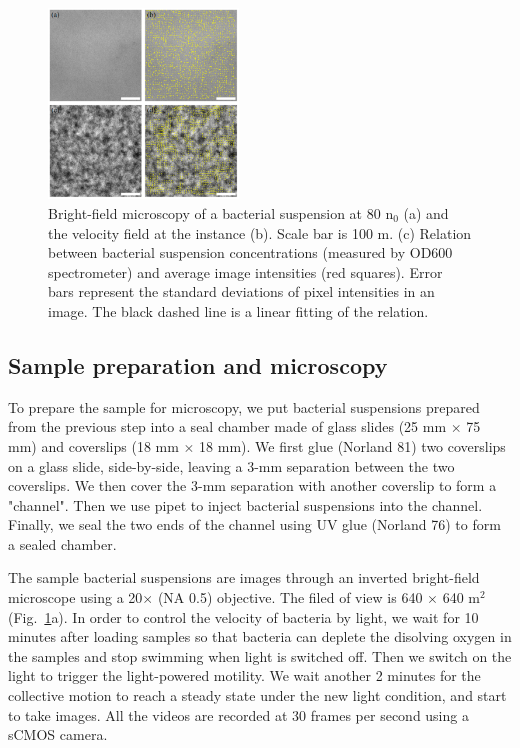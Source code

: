 \documentclass[twocolumn,aps,pre,amsmath,amssymb,floatfix,longbibliography]{revtex4-1}
\begin{document}
\begin{figure}[!]
\begin{center}
\includegraphics[width=0.45\textwidth]{GNF-figures-1-v2.png}
\caption[]{Bright-field microscopy of a bacterial suspension at 80 n$_0$ (a) and the velocity field at the instance (b). Scale bar is 100 \textmu m. (c) Relation between bacterial suspension concentrations (measured by OD600 spectrometer) and average image intensities (red squares). Error bars represent the standard deviations of pixel intensities in an image. The black dashed line is a linear fitting of the relation. }
\label{fig:1}
\end{center}
\end{figure}

\subsection{Sample preparation and microscopy}

To prepare the sample for microscopy, we put bacterial suspensions prepared from the previous step into a seal chamber made of glass slides (25 mm $\times$ 75 mm) and coverslips (18 mm $\times$ 18 mm). We first glue (Norland 81) two coverslips on a glass slide, side-by-side, leaving a 3-mm separation between the two coverslips. We then cover the 3-mm separation with another coverslip to form a "channel". Then we use pipet to inject bacterial suspensions into the channel. Finally, we seal the two ends of the channel using UV glue (Norland 76) to form a sealed chamber.

The sample bacterial suspensions are images through an inverted bright-field microscope using a 20$\times$ (NA 0.5) objective. The filed of view is 640 $\times$ 640 \textmu m$^2$ (Fig.~\ref{fig:1}a). In order to control the velocity of bacteria by light, we wait for 10 minutes after loading samples so that bacteria can deplete the disolving oxygen in the samples and stop swimming when light is switched off. Then we switch on the light to trigger the light-powered motility. We wait another 2 minutes for the collective motion to reach a steady state under the new light condition, and start to take images. All the videos are recorded at 30 frames per second using a sCMOS camera.
\end{document}
